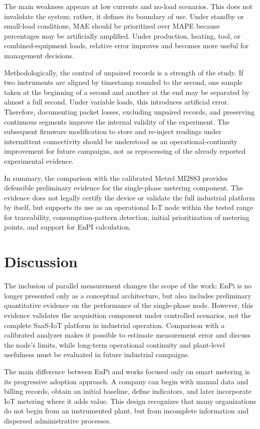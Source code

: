 \documentclass{ieeeaccess}
\begin{document}
The main weakness appears at low currents and no-load scenarios. This does not invalidate the system; rather, it defines its boundary of use. Under standby or small-load conditions, MAE should be prioritized over MAPE because percentages may be artificially amplified. Under production, heating, tool, or combined-equipment loads, relative error improves and becomes more useful for management decisions.

Methodologically, the control of unpaired records is a strength of the study. If two instruments are aligned by timestamp rounded to the second, one sample taken at the beginning of a second and another at the end may be separated by almost a full second. Under variable loads, this introduces artificial error. Therefore, documenting packet losses, excluding unpaired records, and preserving continuous segments improve the internal validity of the experiment. The subsequent firmware modification to store and re-inject readings under intermittent connectivity should be understood as an operational-continuity improvement for future campaigns, not as reprocessing of the already reported experimental evidence.

In summary, the comparison with the calibrated Metrel MI2883 provides defensible preliminary evidence for the single-phase metering component. The evidence does not legally certify the device or validate the full industrial platform by itself, but supports its use as an operational IoT node within the tested range for traceability, consumption-pattern detection, initial prioritization of metering points, and support for EnPI calculation.

\section{Discussion}
\label{sec:discussion}

The inclusion of parallel measurement changes the scope of the work: EnPi is no longer presented only as a conceptual architecture, but also includes preliminary quantitative evidence on the performance of the single-phase node. However, this evidence validates the acquisition component under controlled scenarios, not the complete SaaS-IoT platform in industrial operation. Comparison with a calibrated analyzer makes it possible to estimate measurement error and discuss the node's limits, while long-term operational continuity and plant-level usefulness must be evaluated in future industrial campaigns.

The main difference between EnPi and works focused only on smart metering is its progressive adoption approach. A company can begin with manual data and billing records, obtain an initial baseline, define indicators, and later incorporate IoT metering where it adds value. This design recognizes that many organizations do not begin from an instrumented plant, but from incomplete information and dispersed administrative processes.
\end{document}
